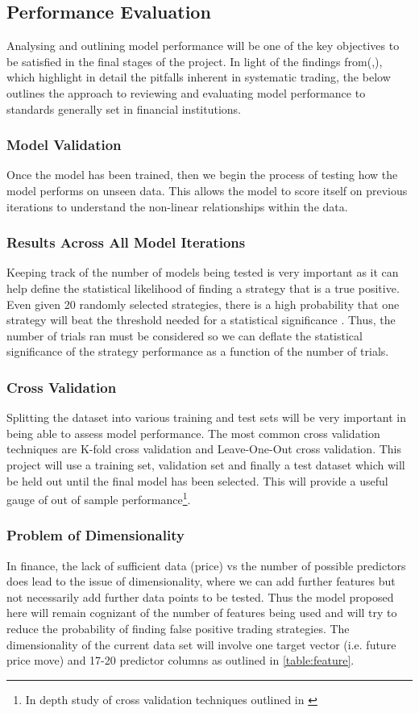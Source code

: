 \documentclass[11pt, a4paper]{article}
\begin{document}
\subsection{Performance Evaluation}
Analysing and outlining model performance will be one of the key objectives to be satisfied in the final stages of the project.
In light of the findings from(\cite{Arnott2018},\cite{Bailey2013}), which highlight in detail the pitfalls inherent in systematic trading, the below outlines the approach to reviewing and evaluating model performance to standards generally set in financial institutions.


\subsubsection{Model Validation}
Once the model has been trained, then we begin the process of testing how the model performs on unseen data. This allows the model to score itself on previous iterations to understand the non-linear relationships within the data.
\subsubsection{Results Across All Model Iterations} 
Keeping track of the number of models being tested is very important as it can help define the statistical likelihood of finding a strategy that is a true positive. Even given 20 randomly selected strategies, there is a high probability that one strategy will beat the threshold needed for a statistical significance \cite{Arnott2018}. Thus, the number of trials ran must be considered so we can deflate the statistical significance of the strategy performance as a function of the number of trials\cite{Bailey2011}.
\subsubsection{Cross Validation}
Splitting the dataset into various training and test sets will be very important in being able to assess model performance. The most common cross validation techniques are K-fold cross validation and Leave-One-Out cross validation. This project will use a training set, validation set and finally a test dataset which will be held out until the final model has been selected. This will provide a useful gauge of out of sample performance\footnote{In depth study of cross validation techniques outlined in \cite{Bergmeir2012}}.
\subsubsection{Problem of Dimensionality}
 In finance, the lack of sufficient data (price) vs the number of possible predictors does lead to the issue of dimensionality, where we can add further features but not necessarily add further data points to be tested. Thus the model proposed here will remain cognizant of the number of features being used and will try to reduce the probability of finding false positive trading strategies. The dimensionality of the current data set will involve one target vector (i.e. future price move) and 17-20 predictor columns as outlined in \ref{table:feature}.
\end{document}
